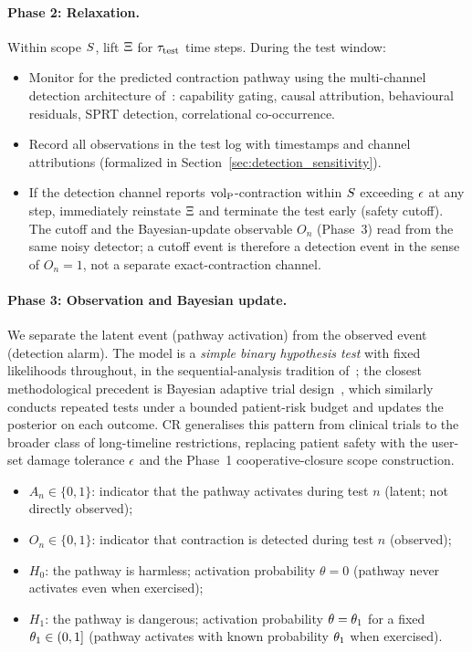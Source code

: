 \paragraph{Phase 2: Relaxation.}
Within scope $S$, lift $\Xi$ for $\tau_{\mathrm{test}}$ time steps.
During the test window:
\begin{itemize}
\item Monitor for the predicted contraction pathway using the
  multi-channel detection architecture
  of~\citep[Table~1]{lasser2026scm}: capability gating, causal
  attribution, behavioural residuals, SPRT detection,
  correlational co-occurrence.
\item Record all observations in the test log with timestamps and
  channel attributions (formalized in
  Section~\ref{sec:detection_sensitivity}).
\item If the detection channel reports ${\operatorname{vol}_{\mathrm{P}}}$-contraction within
  $S$ exceeding $\epsilon$ at any step, immediately
  reinstate $\Xi$ and terminate the test early (safety
  cutoff).  The cutoff and the Bayesian-update observable $O_n$
  (Phase~3) read from the same noisy detector; a cutoff event is
  therefore a detection event in the sense of $O_n = 1$, not a
  separate exact-contraction channel.
\end{itemize}

\paragraph{Phase 3: Observation and Bayesian update.}
We separate the latent event (pathway activation) from the
observed event (detection alarm).  The model is a \emph{simple
binary hypothesis test} with fixed likelihoods throughout, in the
sequential-analysis tradition of~\citet{wald1947sequential}; the
closest methodological precedent is Bayesian adaptive trial
design~\citep{berry2006bayesian}, which similarly conducts
repeated tests under a bounded patient-risk budget and updates
the posterior on each outcome.  CR generalises this pattern from
clinical trials to the broader class of long-timeline
restrictions, replacing patient safety with the user-set damage
tolerance $\epsilon$ and the Phase~1 cooperative-closure
scope construction.

\begin{itemize}
\item $A_n \in \{0, 1\}$: indicator that the pathway activates
  during test $n$ (latent; not directly observed);
\item $O_n \in \{0, 1\}$: indicator that contraction is detected
  during test $n$ (observed);
\item $H_0$: the pathway is harmless; activation probability
  $\theta = 0$ (pathway never activates even when exercised);
\item $H_1$: the pathway is dangerous; activation probability
  $\theta = \theta_1$ for a fixed $\theta_1 \in (0, 1]$
  (pathway activates with known probability $\theta_1$ when
  exercised).
\end{itemize}

